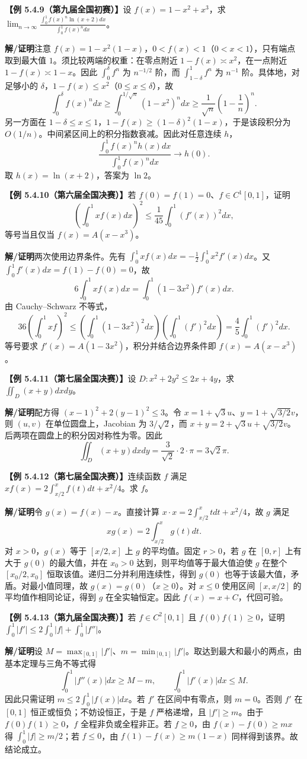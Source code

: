 \documentclass[UTF8,a4paper,11pt]{ctexart}
\newcommand{\ex}[1]{\par\medskip\noindent\textbf{【例 #1】}\;}
\newcommand{\sol}{\par\noindent\textbf{解/证明}\;}
\begin{document}
\ex{5.4.9（第九届全国初赛）}设 $f(x)=1-x^2+x^3$，求 $\lim_{n\to\infty}\frac{\int_0^1f(x)^n\ln(x+2)dx}{\int_0^1f(x)^ndx}$。
\sol 注意 $f(x)=1-x^2(1-x)$，$0<f(x)<1$（$0<x<1$），只有端点取到最大值 $1$。须比较两端的权重：在零点附近 $1-f(x)\asymp x^2$，在一点附近 $1-f(x)\asymp1-x$。因此 $\int_0^\delta f^n$ 为 $n^{-1/2}$ 阶，而 $\int_{1-\delta}^1f^n$ 为 $n^{-1}$ 阶。具体地，对足够小的 $\delta$，$1-f(x)\le x^2$（$0\le x\le\delta$），故
\[\int_0^\delta f(x)^ndx\ge\int_0^{1/\sqrt n}(1-x^2)^ndx
\ge\frac1{\sqrt n}\left(1-\frac1n\right)^n.\]
另一方面在 $1-\delta\le x\le1$，$1-f(x)\ge(1-\delta)^2(1-x)$，于是该段积分为 $O(1/n)$。中间紧区间上的积分指数衰减。因此对任意连续 $h$，
\[\frac{\int_0^1f(x)^nh(x)dx}{\int_0^1f(x)^ndx}\longrightarrow h(0).\]
取 $h(x)=\ln(x+2)$，答案为 $\ln2$。
\ex{5.4.10（第六届全国决赛）}若 $f(0)=f(1)=0$、$f\in C^1[0,1]$，证明
\[\left(\int_0^1xf(x)dx\right)^2\le\frac1{45}\int_0^1(f'(x))^2dx,\]
等号当且仅当 $f(x)=A(x-x^3)$。
\sol 两次使用边界条件。先有 $\int_0^1xf(x)dx=-\frac12\int_0^1x^2f'(x)dx$。又 $\int_0^1f'(x)dx=f(1)-f(0)=0$，故
\[6\int_0^1xf(x)dx=\int_0^1(1-3x^2)f'(x)dx.\]
由 Cauchy--Schwarz 不等式，
\[36\left(\int_0^1xf\right)^2\le\left(\int_0^1(1-3x^2)^2dx\right)\left(\int_0^1(f')^2dx\right)=\frac45\int_0^1(f')^2dx.\]
等号要求 $f'(x)=A(1-3x^2)$，积分并结合边界条件即 $f(x)=A(x-x^3)$。
\ex{5.4.11（第七届全国决赛）}设 $D:x^2+2y^2\le2x+4y$，求 $\iint_D(x+y)dxdy$。
\sol 配方得 $(x-1)^2+2(y-1)^2\le3$。令 $x=1+\sqrt3u$、$y=1+\sqrt{3/2}v$，则 $(u,v)$ 在单位圆盘上，Jacobian 为 $3/\sqrt2$，而 $x+y=2+\sqrt3u+\sqrt{3/2}v$。后两项在圆盘上的积分因对称性为零。因此
\[\iint_D(x+y)dxdy=\frac3{\sqrt2}\cdot2\cdot\pi=3\sqrt2\pi.\]
\ex{5.4.12（第七届全国决赛）}连续函数 $f$ 满足 $xf(x)=2\int_{x/2}^xf(t)dt+x^2/4$。求 $f$。
\sol 令 $g(x)=f(x)-x$。直接计算 $x\cdot x=2\int_{x/2}^xtdt+x^2/4$，故 $g$ 满足
\[xg(x)=2\int_{x/2}^xg(t)dt.\]
对 $x>0$，$g(x)$ 等于 $[x/2,x]$ 上 $g$ 的平均值。固定 $r>0$，若 $g$ 在 $[0,r]$ 上有大于 $g(0)$ 的最大值，并在 $x_0>0$ 达到，则平均值等于最大值迫使 $g$ 在整个 $[x_0/2,x_0]$ 恒取该值。递归二分并利用连续性，得到 $g(0)$ 也等于该最大值，矛盾。对最小值同理，故 $g(x)=g(0)$（$x\ge0$）。对 $x\le0$ 使用区间 $[x,x/2]$ 的平均值作相同论证，得到 $g$ 在全实轴恒定。因此 $f(x)=x+C$，代回可验。
\ex{5.4.13（第九届全国决赛）}若 $f\in C^2[0,1]$ 且 $f(0)f(1)\ge0$，证明 $\int_0^1|f'|\le2\int_0^1|f|+\int_0^1|f''|$。
\sol 设 $M=\max_{[0,1]}|f'|$、$m=\min_{[0,1]}|f'|$。取达到最大和最小的两点，由基本定理与三角不等式得
\[\int_0^1|f''(x)|dx\ge M-m,\qquad \int_0^1|f'(x)|dx\le M.\]
因此只需证明 $m\le2\int_0^1|f(x)|dx$。若 $f'$ 在区间中有零点，则 $m=0$。否则 $f'$ 在 $[0,1]$ 恒正或恒负；不妨设恒正，于是 $f$ 严格递增，且 $|f'|\ge m$。由于 $f(0)f(1)\ge0$，$f$ 全程非负或全程非正。若 $f\ge0$，由 $f(x)-f(0)\ge mx$ 得 $\int_0^1|f|\ge m/2$；若 $f\le0$，由 $f(1)-f(x)\ge m(1-x)$ 同样得到该界。故结论成立。
\end{document}
